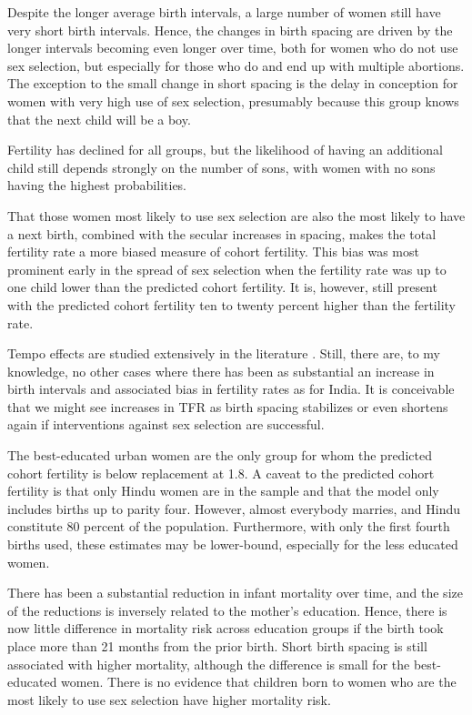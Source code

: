 \documentclass[12pt,letterpaper]{article}
\begin{document}
Despite the longer average birth intervals, a large number of women
still have very short birth intervals. 
Hence, the changes in birth
spacing are driven by the longer intervals becoming even longer over
time, both for women who do not use sex selection, but especially for
those who do and end up with multiple abortions. 
The exception to the
small change in short spacing is the delay in conception for women with
very high use of sex selection, presumably because this group knows that
the next child will be a boy.

Fertility has declined for all groups, but the likelihood of having an additional child
still depends strongly on the number of sons, with women with no sons having the highest 
probabilities.

That those women most likely to use sex selection are also the most
likely to have a next birth, combined with the secular increases in
spacing, makes the total fertility rate a more biased measure of cohort
fertility. 
This bias was most prominent early in the spread of sex
selection when the fertility rate was up to one child lower than the
predicted cohort fertility. 
It is, however, still present with the
predicted cohort fertility ten to twenty percent higher than the
fertility rate.

Tempo effects are studied extensively in the literature \citep[See, for example, ][]{Bongaarts1999}.
Still, there are, to my knowledge, no other cases where there has been as 
substantial an increase in birth intervals and associated bias in fertility rates 
as for India.
It is conceivable that we might see increases in TFR as birth spacing 
stabilizes or even shortens again if interventions against sex selection are successful.

The best-educated urban women are the only group for whom the predicted cohort fertility 
is below replacement at 1.8. 
A caveat to the predicted cohort fertility is that only Hindu women are
in the sample and that the model only includes births up to parity four.
However, almost everybody marries, and Hindu constitute 80 percent of the population.
Furthermore, with only the first fourth births used, these estimates may
be lower-bound, especially for the less educated women.

There has been a substantial reduction in infant mortality over time, and 
the size of the reductions is inversely related to the mother's education.
Hence, there is now little difference in mortality risk across
education groups if the birth took place more than 21 months from the prior birth.
Short birth spacing is still associated with higher mortality, although the difference is 
small for the best-educated women.
There is no evidence that children born to women who are the most likely to use sex 
selection have higher mortality risk. 
\end{document}

